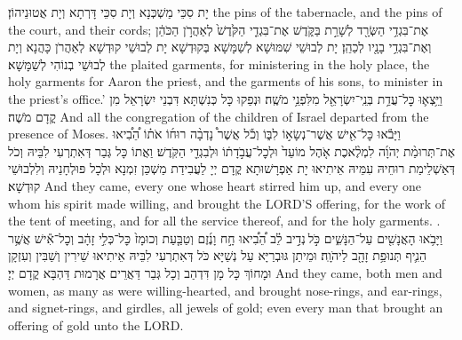 {{יָת סִכֵּי מַשְׁכְּנָא וְיָת סִכֵּי דָּרְתָא וְיָת אֲטוּנֵיהוֹן׃}
{the pins of the tabernacle, and the pins of the court, and their cords;}{}
{אֶת־בִּגְדֵ֥י הַשְּׂרָ֖ד לְשָׁרֵ֣ת בַּקֹּ֑דֶשׁ אֶת־בִּגְדֵ֤י הַקֹּ֙דֶשׁ֙ לְאַהֲרֹ֣ן הַכֹּהֵ֔ן וְאֶת־בִּגְדֵ֥י בָנָ֖יו לְכַהֵֽן׃
}
{יָת לְבוּשֵׁי שִׁמּוּשָׁא לְשַׁמָּשָׁא בְּקוּדְשָׁא יָת לְבוּשֵׁי קוּדְשָׁא לְאַהֲרֹן כָּהֲנָא וְיָת לְבוּשֵׁי בְנוֹהִי לְשַׁמָּשָׁא׃}
{the plaited garments, for ministering in the holy place, the holy garments for Aaron the priest, and the garments of his sons, to minister in the priest’s office.’}{}
{וַיֵּ֥צְא֛וּ כׇּל־עֲדַ֥ת בְּנֵֽי־יִשְׂרָאֵ֖ל מִלִּפְנֵ֥י מֹשֶֽׁה׃}
{וּנְפַקוּ כָּל כְּנִשְׁתָּא דִּבְנֵי יִשְׂרָאֵל מִן קֳדָם מֹשֶׁה׃}
{And all the congregation of the children of Israel departed from the presence of Moses.}{}
{וַיָּבֹ֕אוּ כׇּל־אִ֖ישׁ אֲשֶׁר־נְשָׂא֣וֹ לִבּ֑וֹ וְכֹ֡ל אֲשֶׁר֩ נָדְבָ֨ה רוּח֜וֹ אֹת֗וֹ הֵ֠בִ֠יאוּ אֶת־תְּרוּמַ֨ת יְהֹוָ֜ה לִמְלֶ֨אכֶת אֹ֤הֶל מוֹעֵד֙ וּלְכׇל־עֲבֹ֣דָת֔וֹ וּלְבִגְדֵ֖י הַקֹּֽדֶשׁ׃}
{וַאֲתוֹ כָּל גְּבַר דְּאִתְרְעִי לִבֵּיהּ וְכֹל דְּאַשְׁלֵימַת רוּחֵיהּ עִמֵּיהּ אֵיתִיאוּ יָת אַפְרָשׁוּתָא קֳדָם יְיָ לַעֲבִידַת מַשְׁכַּן זִמְנָא וּלְכָל פּוּלְחָנֵיהּ וְלִלְבוּשֵׁי קוּדְשָׁא׃}
{And they came, every one whose heart stirred him up, and every one whom his spirit made willing, and brought the LORD’S offering, for the work of the tent of meeting, and for all the service thereof, and for the holy garments. .}{}
{וַיָּבֹ֥אוּ הָאֲנָשִׁ֖ים עַל־הַנָּשִׁ֑ים כֹּ֣ל \legarmeh  נְדִ֣יב לֵ֗ב הֵ֠בִ֠יאוּ חָ֣ח וָנֶ֜זֶם וְטַבַּ֤עַת וְכוּמָז֙ כׇּל־כְּלִ֣י זָהָ֔ב וְכׇל־אִ֕ישׁ אֲשֶׁ֥ר הֵנִ֛יף תְּנוּפַ֥ת זָהָ֖ב לַיהֹוָֽה׃
}
{וּמֵיתַן גּוּבְרַיָּא עַל נְשַׁיָּא כֹּל דְּאִתְרְעִי לִבֵּיהּ אֵיתִיאוּ שֵׁירִין וְשַׁבִּין וְעִזְקָן וּמָחוֹךְ כָּל מָן דִּדְהַב וְכָל גְּבַר דַּאֲרֵים אֲרָמוּת דַּהְבָּא קֳדָם יְיָ׃}
{And they came, both men and women, as many as were willing-hearted, and brought nose-rings, and ear-rings, and signet-rings, and girdles, all jewels of gold; even every man that brought an offering of gold unto the LORD.}{}
}

